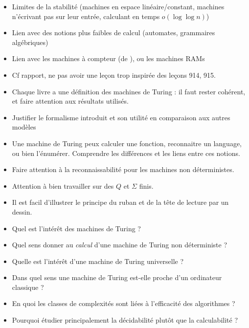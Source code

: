 \documentclass{agregfiche}
\begin{document}
\secidees

\begin{itemize}
	\item Limites de la stabilité (machines en espace linéaire/constant, 
	machines n'écrivant pas sur leur entrée,
	calculant en temps $o(\log \log n)$)
	\item Lien avec des notions plus faibles de calcul (automates, grammaires
	algébriques)
	\item Lien avec les machines à compteur (de ), ou les machines RAMs

\end{itemize}

\secpieges

\begin{itemize}
    \item Cf rapport, ne pas avoir une leçon trop inspirée des leçons 914, 915.
    \item Chaque livre a une définition des machines de Turing : il faut rester cohérent, et faire attention aux résultats utilisés.
    \item Justifier le formalisme introduit et son utilité en comparaison
        aux autres modèles
    \item Une machine de Turing peux calculer une fonction, reconnaitre un language, ou bien l'énumérer. Comprendre les différences et les liens entre ces notions.
    \item Faire attention à la reconnaissabilité pour les machines 
        non déterministes.
     \item Attention à bien travailler sur des $Q$ et $\Sigma$
      finis.
      \item Il est facil d'illustrer le principe du ruban et de la tête de lecture par un dessin.
\end{itemize}

\secquestionsclassiques

\begin{itemize}
    \item Quel est l'intérêt des machines de Turing ?
    \item Quel sens donner au \emph{calcul} d'une machine de Turing non
        déterministe ?
    \item Quelle est l'intérêt d'une machine de Turing universelle ?
    \item Dans quel sens une machine de Turing est-elle proche d'un ordinateur
        classique ?
    \item En quoi les classes de complexités sont liées à l'efficacité des
        algorithmes ?
    \item Pourquoi étudier principalement la décidabilité plutôt que la
        calculabilité ?
\end{itemize}
\end{document}
